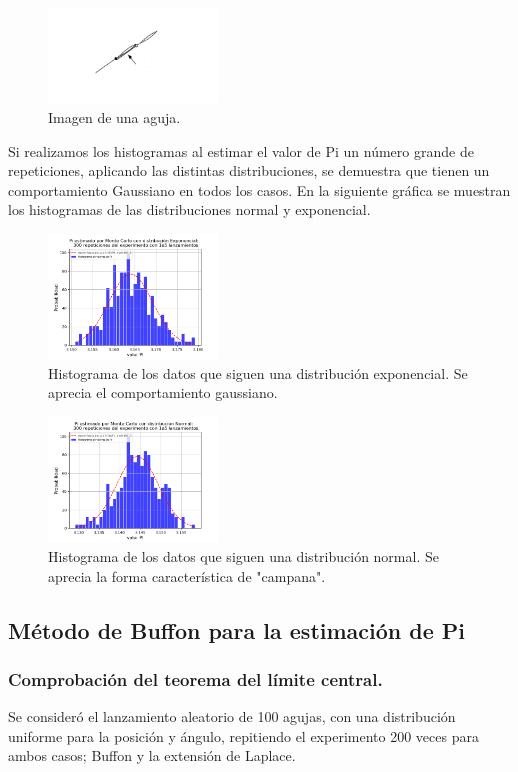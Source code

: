 \documentclass{rbf}
\begin{document}
\begin{figure}[h]
 \centering
  \includegraphics[width=0.4\textwidth]{figures/aguja.png}
	\caption{Imagen de una aguja.\cite{Statistics}}
 \label{buff7}
\end{figure}
Si realizamos los histogramas al estimar el valor de Pi un número grande de repeticiones, aplicando las distintas distribuciones, se demuestra que tienen un comportamiento Gaussiano en todos los casos. En la siguiente gráfica se muestran los histogramas de las distribuciones normal y exponencial. 
\begin{figure}[tbp!]
 \centering
  \includegraphics[width=0.4\textwidth]{figures/MCdistExp.png}
	\caption{Histograma de los datos que siguen una distribución exponencial. Se aprecia el comportamiento gaussiano.}
 \label{buff8}
\end{figure}
\begin{figure}[h]
 \centering
  \includegraphics[width=0.4\textwidth]{figures/MCdistNorm.png}
	\caption{Histograma de los datos que siguen una distribución normal. Se aprecia la forma característica de "campana".}
 \label{buff9}
\end{figure}
\subsection{Método de Buffon para la estimación de Pi}
\subsubsection{Comprobación del teorema del límite central.}
Se consideró el lanzamiento aleatorio de 100 agujas, con una distribución uniforme para la posición y ángulo, repitiendo el experimento 200 veces para ambos casos; Buffon y la extensión de Laplace.
\end{document}
